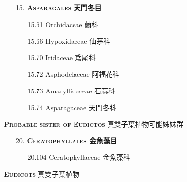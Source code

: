 \begin{enumerate}
  \item[15. ] \textbf{\textsc{Asparagales} 天門冬目}   
    \begin{enumerate}
      \item[15.61] Orchidaceae 蘭科     
        
      \item[15.66] Hypoxidaceae 仙茅科     
        
      \item[15.70] Iridaceae 鳶尾科     
        
      \item[15.72] Asphodelaceae 阿福花科     
        
      \item[15.73] Amaryllidaceae 石蒜科     
        
      \item[15.74] Asparagaceae 天門冬科     
        
    \end{enumerate}
\end{enumerate}
\vspace{2ex} 
\noindent \normalsize\textsc{\textbf{Probable sister of Eudictos} 真雙子葉植物可能姊妹群}\selectfont \\
\footnotesize\selectfont
\begin{enumerate}
  \item[20. ] \textbf{\textsc{Ceratophyllales} 金魚藻目}   
    \begin{enumerate}
      \item[20.104] Ceratophyllaceae 金魚藻科     
        
    \end{enumerate}
\end{enumerate}
\vspace{2ex} 
\noindent \normalsize\textsc{\textbf{Eudicots} 真雙子葉植物}\selectfont \\
\footnotesize\selectfont
